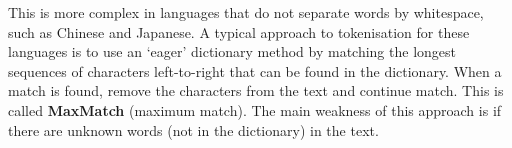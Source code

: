 \documentclass[Report.tex]{subfiles}
\begin{document}
This is more complex in languages that do not separate words by whitespace,
such as Chinese and Japanese. A typical approach to tokenisation for
these languages is to use an `eager' dictionary method by matching the
longest sequences of characters left-to-right that can be found in the
dictionary. When a match is found, remove the characters from the text and
continue match. This is called \textbf{MaxMatch} (maximum match). The main
weakness of this approach is if there are unknown words (not in the dictionary)
in the text.
\end{document}

